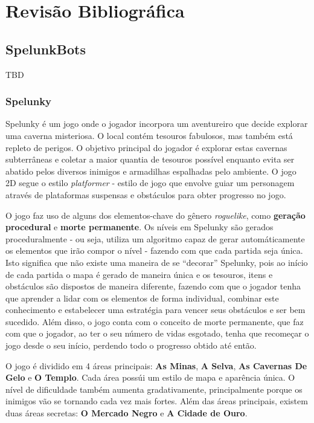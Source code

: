 \chapter{\label{chap:lit-review}Revisão Bibliográfica}

\section{SpelunkBots} TBD

\subsection{Spelunky}
Spelunky \cite{SPELUNKYWEB} é um jogo onde o jogador incorpora um aventureiro
que decide explorar uma caverna misteriosa. O local contém tesouros fabulosos,
mas também está repleto de perigos. O objetivo principal do jogador é explorar
estas cavernas subterrâneas e coletar a maior quantia de tesouros possível
enquanto evita ser abatido pelos diversos inimigos e armadilhas espalhadas pelo
ambiente. O jogo 2D segue o estilo \textit{platformer} - estilo de jogo
que envolve guiar um personagem através de plataformas suspensas e obstáculos
para obter progresso no jogo.

O jogo faz uso de alguns dos elementos-chave do gênero \textit{roguelike}, como
\textbf{geração procedural} e \textbf{morte permanente}. Os níveis em Spelunky
são gerados proceduralmente - ou seja, utiliza um algoritmo capaz de gerar
automáticamente os elementos que irão compor o nível - fazendo com que cada
partida seja única. Isto significa que não existe uma maneira de se ``decorar''
Spelunky, pois ao início de cada partida o mapa é gerado de maneira única e os
tesouros, itens e obstáculos são dispostos de maneira diferente, fazendo com que
o jogador tenha que aprender a lidar com os elementos de forma individual,
combinar este conhecimento e estabelecer uma estratégia para vencer seus
obstáculos e ser bem sucedido. Além disso, o jogo conta com o conceito de morte
permanente, que faz com que o jogador, ao ter o seu número de vidas esgotado,
tenha que recomeçar o jogo desde o seu início, perdendo todo o progresso obtido
até então.

O jogo é dividido em 4 áreas principais: \textbf{As Minas}, \textbf{A Selva},
\textbf{As Cavernas De Gelo} e \textbf{O Templo}. Cada área possúi um estilo de
mapa e aparência única. O nível de dificuldade também aumenta gradativamente,
principalmente porque os inimigos vão se tornando cada vez mais fortes. Além das
áreas principais, existem duas áreas secretas: \textbf{O Mercado Negro} e
\textbf{A Cidade de Ouro}.


